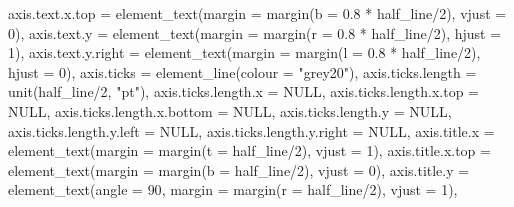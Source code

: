\documentclass[
]{book}
\newenvironment{Shaded}{\begin{snugshade}}{\end{snugshade}}
\newcommand{\AttributeTok}[1]{\textcolor[rgb]{0.77,0.63,0.00}{#1}}
\newcommand{\ConstantTok}[1]{\textcolor[rgb]{0.00,0.00,0.00}{#1}}
\newcommand{\DecValTok}[1]{\textcolor[rgb]{0.00,0.00,0.81}{#1}}
\newcommand{\FloatTok}[1]{\textcolor[rgb]{0.00,0.00,0.81}{#1}}
\newcommand{\FunctionTok}[1]{\textcolor[rgb]{0.00,0.00,0.00}{#1}}
\newcommand{\NormalTok}[1]{#1}
\newcommand{\SpecialCharTok}[1]{\textcolor[rgb]{0.00,0.00,0.00}{#1}}
\newcommand{\StringTok}[1]{\textcolor[rgb]{0.31,0.60,0.02}{#1}}
\begin{document}
\begin{Shaded}
\begin{Highlighting}[]
               \AttributeTok{axis.text.x.top =} \FunctionTok{element\_text}\NormalTok{(}\AttributeTok{margin =} \FunctionTok{margin}\NormalTok{(}\AttributeTok{b =} \FloatTok{0.8} \SpecialCharTok{*}\NormalTok{ half\_line}\SpecialCharTok{/}\DecValTok{2}\NormalTok{), }\AttributeTok{vjust =} \DecValTok{0}\NormalTok{), }
               \AttributeTok{axis.text.y =} \FunctionTok{element\_text}\NormalTok{(}\AttributeTok{margin =} \FunctionTok{margin}\NormalTok{(}\AttributeTok{r =} \FloatTok{0.8} \SpecialCharTok{*}\NormalTok{ half\_line}\SpecialCharTok{/}\DecValTok{2}\NormalTok{), }\AttributeTok{hjust =} \DecValTok{1}\NormalTok{), }
               \AttributeTok{axis.text.y.right =} \FunctionTok{element\_text}\NormalTok{(}\AttributeTok{margin =} \FunctionTok{margin}\NormalTok{(}\AttributeTok{l =} \FloatTok{0.8} \SpecialCharTok{*}\NormalTok{ half\_line}\SpecialCharTok{/}\DecValTok{2}\NormalTok{), }\AttributeTok{hjust =} \DecValTok{0}\NormalTok{), }
               \AttributeTok{axis.ticks =} \FunctionTok{element\_line}\NormalTok{(}\AttributeTok{colour =} \StringTok{"grey20"}\NormalTok{), }
               \AttributeTok{axis.ticks.length =} \FunctionTok{unit}\NormalTok{(half\_line}\SpecialCharTok{/}\DecValTok{2}\NormalTok{, }\StringTok{"pt"}\NormalTok{), }\AttributeTok{axis.ticks.length.x =} \ConstantTok{NULL}\NormalTok{, }
               \AttributeTok{axis.ticks.length.x.top =} \ConstantTok{NULL}\NormalTok{, }\AttributeTok{axis.ticks.length.x.bottom =} \ConstantTok{NULL}\NormalTok{, }
               \AttributeTok{axis.ticks.length.y =} \ConstantTok{NULL}\NormalTok{, }\AttributeTok{axis.ticks.length.y.left =} \ConstantTok{NULL}\NormalTok{, }
               \AttributeTok{axis.ticks.length.y.right =} \ConstantTok{NULL}\NormalTok{, }
               \AttributeTok{axis.title.x =} \FunctionTok{element\_text}\NormalTok{(}\AttributeTok{margin =} \FunctionTok{margin}\NormalTok{(}\AttributeTok{t =}\NormalTok{ half\_line}\SpecialCharTok{/}\DecValTok{2}\NormalTok{), }\AttributeTok{vjust =} \DecValTok{1}\NormalTok{), }
               \AttributeTok{axis.title.x.top =} \FunctionTok{element\_text}\NormalTok{(}\AttributeTok{margin =} \FunctionTok{margin}\NormalTok{(}\AttributeTok{b =}\NormalTok{ half\_line}\SpecialCharTok{/}\DecValTok{2}\NormalTok{), }\AttributeTok{vjust =} \DecValTok{0}\NormalTok{), }
               \AttributeTok{axis.title.y =} \FunctionTok{element\_text}\NormalTok{(}\AttributeTok{angle =} \DecValTok{90}\NormalTok{, }\AttributeTok{margin =} \FunctionTok{margin}\NormalTok{(}\AttributeTok{r =}\NormalTok{ half\_line}\SpecialCharTok{/}\DecValTok{2}\NormalTok{), }\AttributeTok{vjust =} \DecValTok{1}\NormalTok{), }

\end{Highlighting}
\end{Shaded}
\end{document}
